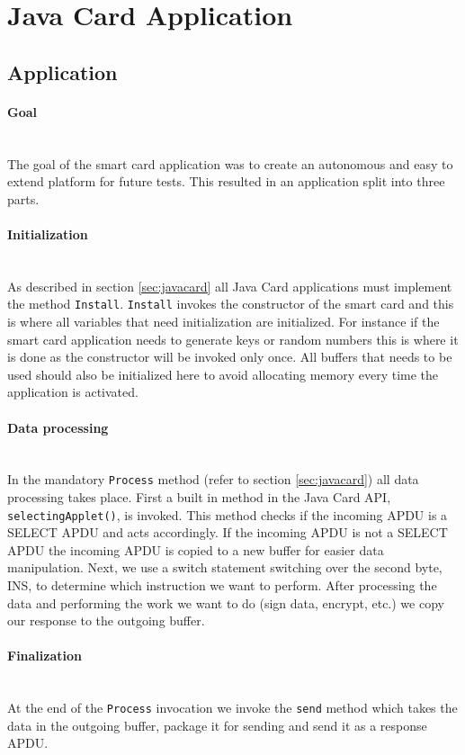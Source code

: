 \section{Java Card Application}
\subsection{Application}
\paragraph{Goal}\mbox{}\\
The goal of the smart card application was to create an autonomous and easy to extend platform for future tests. This resulted in an application split into three parts.

\paragraph{Initialization}\mbox{}\\
As described in section \ref{sec:javacard} all Java Card applications must implement the method \texttt{Install}. \texttt{Install} invokes the constructor of the smart card and this is where all variables that need initialization are initialized. For instance if the smart card application needs to generate keys or random numbers this is where it is done as the constructor will be invoked only once. All buffers that needs to be used should also be initialized here to avoid allocating memory every time the application is activated.

\paragraph{Data processing}\mbox{}\\
In the mandatory \texttt{Process} method (refer to section \ref{sec:javacard}) all data processing takes place. First a built in method in the Java Card API, \texttt{selectingApplet()}, is invoked. This method checks if the incoming APDU is a SELECT APDU and acts accordingly. If the incoming APDU is not a SELECT APDU the incoming APDU is copied to a new buffer for easier data manipulation. Next, we use a switch statement switching over the second byte, INS, to determine which instruction we want to perform. After processing the data and performing the work we want to do (sign data, encrypt, etc.) we copy our response to the outgoing buffer.

\paragraph{Finalization}\mbox{}\\
At the end of the \texttt{Process} invocation we invoke the \texttt{send} method which takes the data in the outgoing buffer, package it for sending and send it as a response APDU.

